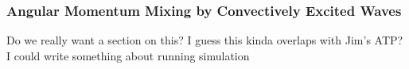 {\color{purple}
\subsubsection{Angular Momentum Mixing by Convectively Excited Waves}}

Do we really want a section on this?  I guess this kinda overlaps with Jim's ATP?  I could write something about running simulation
